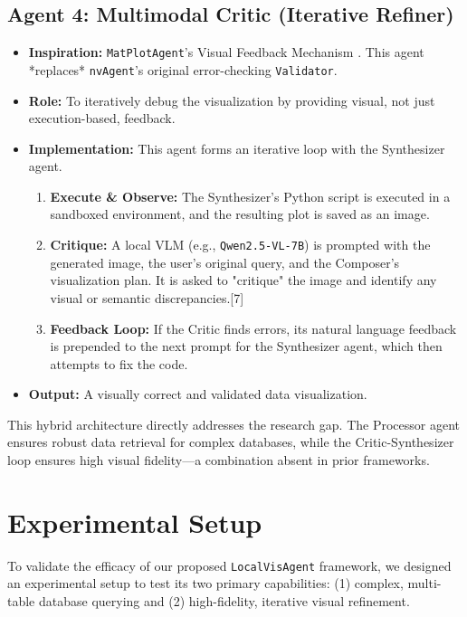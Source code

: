 \documentclass[a4paper,oneside,bibliography=totoc]{scrbook}
\begin{document}
\section{Agent 4: Multimodal Critic (Iterative Refiner)}
\begin{itemize}
 \item \textbf{Inspiration:} \texttt{MatPlotAgent}'s Visual Feedback Mechanism \cite{[7]}. This agent *replaces* \texttt{nvAgent}'s original error-checking \texttt{Validator}.
 \item \textbf{Role:} To iteratively debug the visualization by providing visual, not just execution-based, feedback.
 \item \textbf{Implementation:} This agent forms an iterative loop with the Synthesizer agent.
 \begin{enumerate}
 \item \textbf{Execute \& Observe:} The Synthesizer's Python script is executed in a sandboxed environment, and the resulting plot is saved as an image.
 \item \textbf{Critique:} A local VLM (e.g., \texttt{Qwen2.5-VL-7B}) is prompted with the generated image, the user's original query, and the Composer's visualization plan. It is asked to "critique" the image and identify any visual or semantic discrepancies.[7]
 \item \textbf{Feedback Loop:} If the Critic finds errors, its natural language feedback is prepended to the next prompt for the Synthesizer agent, which then attempts to fix the code.
 \end{enumerate}
 \item \textbf{Output:} A visually correct and validated data visualization.
\end{itemize}

This hybrid architecture directly addresses the research gap. The Processor agent ensures robust data retrieval for complex databases, while the Critic-Synthesizer loop ensures high visual fidelity---a combination absent in prior frameworks.

\chapter{Experimental Setup}

To validate the efficacy of our proposed \texttt{LocalVisAgent} framework, we designed an experimental setup to test its two primary capabilities: (1) complex, multi-table database querying and (2) high-fidelity, iterative visual refinement.
\end{document}
